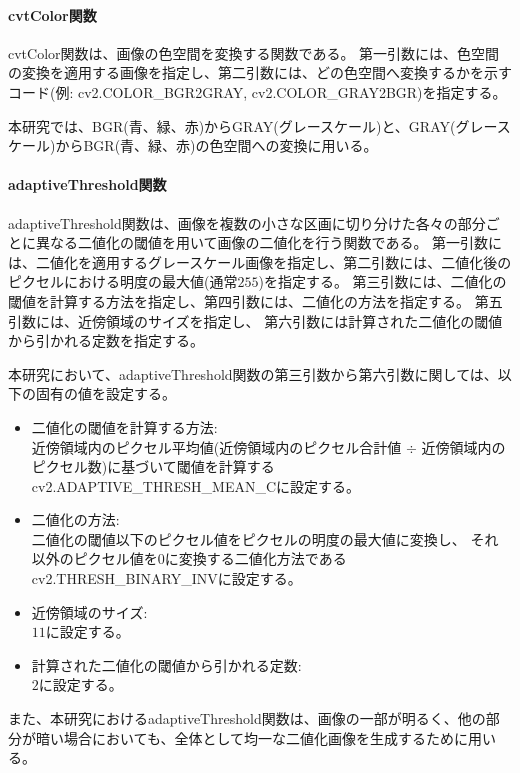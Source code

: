 \paragraph{cvtColor関数}
cvtColor関数は、画像の色空間を変換する関数である。
第一引数には、色空間の変換を適用する画像を指定し、第二引数には、どの色空間へ変換するかを示すコード(例: cv2.COLOR\_BGR2GRAY, cv2.COLOR\_GRAY2BGR)を指定する。
\par
本研究では、BGR(青、緑、赤)からGRAY(グレースケール)と、GRAY(グレースケール)からBGR(青、緑、赤)の色空間への変換に用いる。
\paragraph{adaptiveThreshold関数}
adaptiveThreshold関数は、画像を複数の小さな区画に切り分けた各々の部分ごとに異なる二値化の閾値を用いて画像の二値化を行う関数である。
第一引数には、二値化を適用するグレースケール画像を指定し、第二引数には、二値化後のピクセルにおける明度の最大値(通常$255$)を指定する。
第三引数には、二値化の閾値を計算する方法を指定し、第四引数には、二値化の方法を指定する。
第五引数には、近傍領域のサイズを指定し、
第六引数には計算された二値化の閾値から引かれる定数を指定する。
\par
本研究において、adaptiveThreshold関数の第三引数から第六引数に関しては、以下の固有の値を設定する。
\begin{itemize}
      \setlength{\itemsep}{0pt}
            \setlength{\parsep}{0pt}
      \item 二値化の閾値を計算する方法:\\
            近傍領域内のピクセル平均値(近傍領域内のピクセル合計値 $\div$ 近傍領域内のピクセル数)に基づいて閾値を計算するcv2.ADAPTIVE\_THRESH\_MEAN\_Cに設定する。
      \item 二値化の方法:\\
            二値化の閾値以下のピクセル値をピクセルの明度の最大値に変換し、
            それ以外のピクセル値を$0$に変換する二値化方法であるcv2.THRESH\_BINARY\_INVに設定する。
      \item 近傍領域のサイズ:\\
            $11$に設定する。
      \item 計算された二値化の閾値から引かれる定数:\\
            $2$に設定する。
\end{itemize}
\par
また、本研究におけるadaptiveThreshold関数は、画像の一部が明るく、他の部分が暗い場合においても、全体として均一な二値化画像を生成するために用いる。
\par
